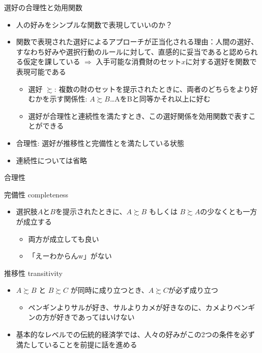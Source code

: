 \documentclass[dvipdfmx,11pt]{beamer}
\begin{document}
\begin{frame}{選好の合理性と効用関数}
  \begin{itemize}
    \item 人の好みをシンプルな関数で表現していいのか？
    \item 関数で表現された選好によるアプローチが正当化される理由：人間の選好、すなわち好みや選択行動のルールに対して、直感的に妥当であると認められる仮定を課している
    $\Rightarrow$ 入手可能な消費財のセット$x$に対する選好を関数で表現可能である
    \begin{itemize}
      \item 選好 $\succsim $: 複数の財のセットを提示されたときに、両者のどちらをより好むかを示す関係性: $A \succsim B$\dots AをBと同等かそれ以上に好む
      \item 選好が合理性と連続性を満たすとき、この選好関係を効用関数で表すことができる
    \end{itemize}
    \item 合理性: 選好が推移性と完備性とを満たしている状態
    \item 連続性については省略
  \end{itemize}
\end{frame}

\begin{frame}{合理性}
  \begin{itembox}[l]{完備性 completeness}
    \begin{itemize}
      \item 選択肢$A$と$B$を提示されたときに、$A \succsim B$ もしくは $B \succsim A$の少なくとも一方が成立する
      \begin{itemize}
        \item 両方が成立しても良い
        \item 「えーわからんw」がない
      \end{itemize}
    \end{itemize}
  \end{itembox}
  \begin{itembox}[l]{推移性 transitivity}
    \begin{itemize}
      \item $A \succsim B$ と $B \succsim C$ が同時に成り立つとき、$A \succsim C$が必ず成り立つ
      \begin{itemize}
        \item ペンギンよりサルが好き、サルよりカメが好きなのに、カメよりペンギンの方が好きであってはいけない
      \end{itemize}
    \end{itemize}
  \end{itembox}
  \begin{itemize}
    \item 基本的なレベルでの伝統的経済学では、人々の好みがこの2つの条件を必ず満たしていることを前提に話を進める
  \end{itemize}
\end{frame}
\end{document}
